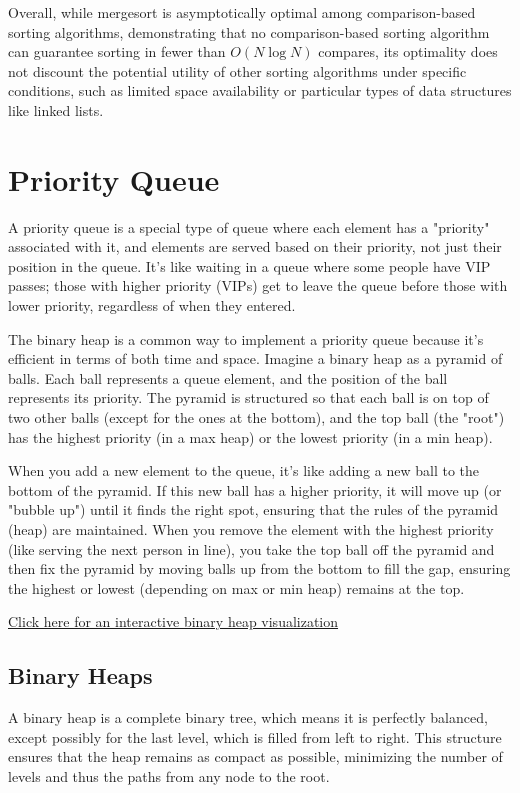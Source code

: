 \documentclass{article}
\begin{document}
Overall, while mergesort is asymptotically optimal among comparison-based sorting algorithms, demonstrating that no comparison-based sorting algorithm can guarantee sorting in fewer than \(O(N \log N)\) compares, its optimality does not discount the potential utility of other sorting algorithms under specific conditions, such as limited space availability or particular types of data structures like linked lists.

\section{Priority Queue}

A priority queue is a special type of queue where each element has a "priority" associated with it, and elements are served based on their priority, not just their position in the queue. It's like waiting in a queue where some people have VIP passes; those with higher priority (VIPs) get to leave the queue before those with lower priority, regardless of when they entered.

The binary heap is a common way to implement a priority queue because it's efficient in terms of both time and space. Imagine a binary heap as a pyramid of balls. Each ball represents a queue element, and the position of the ball represents its priority. The pyramid is structured so that each ball is on top of two other balls (except for the ones at the bottom), and the top ball (the "root") has the highest priority (in a max heap) or the lowest priority (in a min heap).

When you add a new element to the queue, it's like adding a new ball to the bottom of the pyramid. If this new ball has a higher priority, it will move up (or "bubble up") until it finds the right spot, ensuring that the rules of the pyramid (heap) are maintained. When you remove the element with the highest priority (like serving the next person in line), you take the top ball off the pyramid and then fix the pyramid by moving balls up from the bottom to fill the gap, ensuring the highest or lowest (depending on max or min heap) remains at the top.

\href{https://visualgo.net/en/heap}{Click here for an interactive binary heap visualization}

\subsection{Binary Heaps}

A binary heap is a complete binary tree, which means it is perfectly balanced, except possibly for the last level, which is filled from left to right. This structure ensures that the heap remains as compact as possible, minimizing the number of levels and thus the paths from any node to the root.
\end{document}
